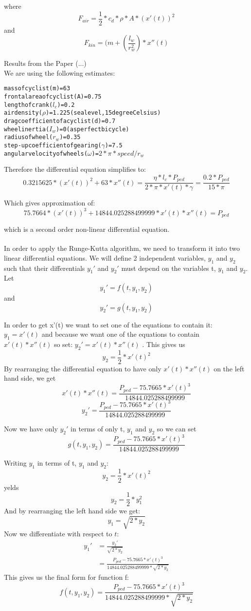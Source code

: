 \documentclass[10pt, a4paper]{report}
\begin{document}
where $$ F_{air} 	= \frac{1}{2} * c_{d} * \rho * A * ( x'(t) )^{2} $$
and	  $$ F_{kin} 	= ( m + ( \frac{l_w}{r_w^{2}} ) * x''(t) $$

Results from the Paper (...)\\

We are using the following estimates:

\begin{alltt}
mass of cyclist (m) 				= 63
frontal area of cyclist (A) 		= 0.75
length of crank (\(l_{c}\)) 		= 0.2
air density (\(\rho\)) 				= 1.225 (sea level, 15 degree Celsius)
drag coefficient of a cyclist (d) 	= 0.7
wheel inertia (\(I_w\)) = 0 (as perfect bicycle)
radius of wheel (\(r_w\)) = 0.35
step-up coefficient of gearing (\(\gamma\)) = 7.5
angular velocity of wheels (\(\omega\)) = \(2 * \pi * speed / {r_{w}} \)
\end{alltt}

Therefore the differential equation simplifies to:
$$ 0.3215625 * (x'(t))^{2} + 63 * x''(t)
	= \frac{\eta * l_{c} * P_{ped}} {2 * \pi * x'(t) * \gamma }
	= \frac {0.2 * P_{ped}} {15 * \pi} $$

Which gives approximation of:
$$ 75.7664 *(x'(t))^{3} + 14844.025288499999 * x'(t) * x''(t) = P_{ped}$$

which is a second order non-linear differential equation.\\\\
In order to apply the Runge-Kutta algorithm, we need to transform it into two linear differential equations. We will define 2 independent variables, $y_1$ and $y_2$ such that their differentials $y_1'$ and $y_2'$ must depend on the variables t, $y_1$ and $y_2$. Let
$$ y_1' = f( t, y_1, y_2 )$$ and $$y_2' = g( t, y_1, y_2 )$$

In order to get x'(t) we want to set one of the equations to contain it: $y_1 = x'(t)$ and because we want one of the equations to contain $x'(t) * x''(t) $ so set: $y_2' = x'( t ) * x''( t )$ .
This gives us $$ y_{2} = \frac{1}{2} * x'(t)^2 $$
By rearranging the differential equation to have only $ x'( t ) * x''( t )$ on the left hand side, we get
$$ x'( t ) * x''( t ) = \frac{P_{ped} - 75.7665 * x'( t ) ^ 3}{14844.025288499999}$$
$$ y_2' = \frac{P_{ped} - 75.7665 * x'( t ) ^ 3}{14844.025288499999}$$

Now we have only $y_2'$ in terms of only t, $y_1$ and $y_2$ so we can set $$ g( t, y_1, y_2 ) = \frac{P_{ped} - 75.7665 * x'( t ) ^ 3}{14844.025288499999}$$

Writing $y_1$ in terms of t, $y_1$ and $y_2$: $$y_2 = \frac{1}{2} * x'(t)^2$$ yelds $$y_2 = \frac{1}{2} * y_1^2$$
And by rearranging the left hand side we get:
$$y_1 = \sqrt{2 * y_2}$$
Now we differentiate with respect to $t$:
\begin{align*}
y_1' & = \frac{y_2'}{\sqrt{2 * y_2}}\\
& = \frac{P_{ped} - 75.7665 * x'( t ) ^ 3}{14844.025288499999 * \sqrt{2 * y_2}}
\end{align*}
This gives us the final form for function f:
$$ f(t, y_1, y_2) = \frac{P_{ped} - 75.7665 * x'( t ) ^ 3}{14844.025288499999 * \sqrt{2 * y_2}}$$
\end{document}
